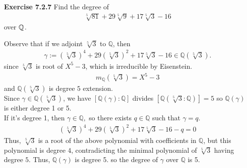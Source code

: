 \documentclass{article}
\begin{document}
\begin{homeworkProblem}
    \textbf{Exercise 7.2.7} Find the degree of 
    \begin{align}
        \sqrt[5]{81} + 29\sqrt[5]{9} + 17\sqrt[5]{3} - 16
    \end{align}
    over $\mathbb{Q}$.

    \solution

    Observe that if we adjoint $\sqrt[5]{3}$ to $\mathbb{Q}$, then 
    \begin{align}
        \gamma := (\sqrt[5]{3})^4 + 29 (\sqrt[5]{3})^2 + 17 \sqrt[5]{3} - 16 \in \mathbb{Q}(\sqrt[5]{3}).
    \end{align}
    since $\sqrt[5]{3}$ is root of $X^5 - 3$, which is irreducible by Eisenstein.
    \begin{align}
        m_{\mathbb{Q}}(\sqrt[5]{3}) = X^5 - 3
    \end{align}
    and $\mathbb{Q}(\sqrt[5]{3})$ is degree $5$ extension.\\
    Since $\gamma \in \mathbb{Q}(\sqrt[5]{3})$, we have
    $[\mathbb{Q}(\gamma) : \mathbb{Q}]$ divides $[\mathbb{Q}(\sqrt[5]{3}:\mathbb{Q})]=5$
    so $\mathbb{Q}(\gamma)$ is either degree 1 or 5.\\
    If it's degree 1, then $\gamma \in \mathbb{Q},$ so there exists $q \in \mathbb{Q}$ such that 
    $\gamma = q$.
    \begin{align}
        \left( \sqrt[5]{3} \right)^4 + 29 \left( \sqrt[5]{3} \right)^2 + 17 \sqrt[5]{3} - 16 - q = 0
    \end{align}
    Thus, $\sqrt[5]{3}$ is a root of the above polynomial with coefficients in $\mathbb{Q}$,
    but this polynomial is degree $4$, contradicting the minimal polynomial 
    of $\sqrt[5]{3}$ having degree $5$.
    Thus, $\mathbb{Q}(\gamma)$ is degree 5. so the degree of $\gamma$ over $\mathbb{Q}$ is 5.

    


    
    

\end{homeworkProblem}

\pagebreak
\end{document}
